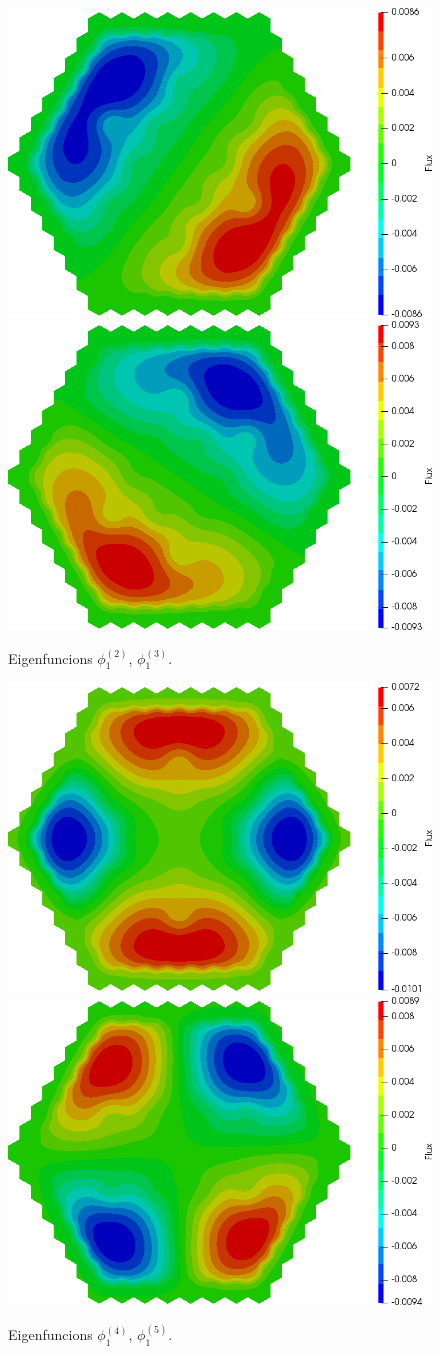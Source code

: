 \documentclass[authoryear]{elsarticle}
\begin{document}
\begin{figure}[H]
\begin{center}
	\includegraphics[width=0.49\linewidth]{iaea_with/alpha_sp3_u1_2.png}
	\includegraphics[width=0.49\linewidth]{iaea_with/alpha_sp3_u1_3.png}\\
	\caption{Eigenfuncions $\phi_1^{(2)}$, $\phi_1^{(3)}$.}
	\label{fig:iaea_with_fun_2}
\end{center}
\end{figure}
\begin{figure}[H]
\begin{center}
	\includegraphics[width=0.49\linewidth]{iaea_with/alpha_sp3_u1_4.png}
	\includegraphics[width=0.49\linewidth]{iaea_with/alpha_sp3_u1_5.png}\\
	\caption{Eigenfuncions $\phi_1^{(4)}$, $\phi_1^{(5)}$.}
	\label{fig:iaea_with_fun_3}
\end{center}
\end{figure}
\end{document}
